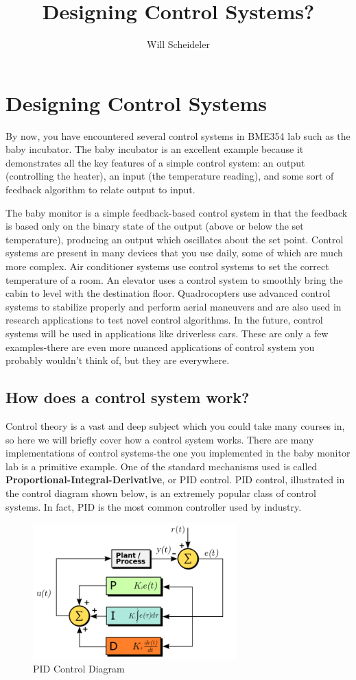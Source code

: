 \documentclass[10pt]{report}
\title{Designing Control Systems?}
\author{Will Scheideler}
\begin{document}
\section*{Designing Control Systems}

\par  By now, you have encountered several control systems in BME354 lab such as the baby incubator. The baby incubator is an excellent example because it demonstrates all the key features of a simple control system: an output (controlling the heater), an input (the temperature reading), and some sort of feedback algorithm to relate output to input.

\par The baby monitor is a simple feedback-based control system in that the feedback is based only on the binary state of the output (above or below the set temperature), producing an output which oscillates about the set point. Control systems are present in many devices that you use daily, some of which are much more complex. Air conditioner systems use control systems to set the correct temperature of a room. An elevator uses a control system to smoothly bring the cabin to level with the destination floor. Quadrocopters use advanced control systems to stabilize properly and perform aerial maneuvers and are also used in research applications to test novel control algorithms. In the future, control systems will be used in applications like driverless cars. These are only a few examples-there are even more nuanced applications of control system you probably wouldn't think of, but they are everywhere.

\subsection*{How does a control system work? }

\par Control theory is a vast and deep subject which you could take many courses in, so here we will briefly cover how a control system works. There are many implementations of control systems-the one you implemented in the baby monitor lab is a primitive example. One of the standard mechanisms used is called \textbf{Proportional-Integral-Derivative}, or PID control. PID control, illustrated in the control diagram shown below, is an extremely popular class of control systems. In fact, PID is the most common controller used by industry.

\begin{figure}[H]
\centering
   \includegraphics[width=0.7\textwidth]{PID.png}
    \caption{PID Control Diagram}
\end{figure}
\end{document}
